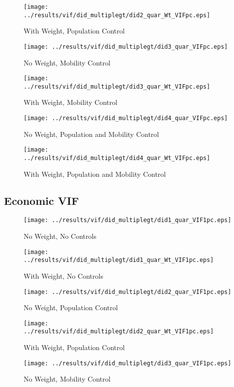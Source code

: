 \documentclass[11pt,letterpaper]{article}
\begin{document}
\begin{figure}[H]
\caption{With Weight, Population Control}
\centering
\texttt{[image: ../results/vif/did\_multiplegt/did2\_quar\_Wt\_VIFpc.eps]}
\end{figure}
\begin{figure}[H]
\caption{No Weight, Mobility Control}
\centering
\texttt{[image: ../results/vif/did\_multiplegt/did3\_quar\_VIFpc.eps]}
\end{figure}

\begin{figure}[H]
\caption{With Weight, Mobility Control}
\centering
\texttt{[image: ../results/vif/did\_multiplegt/did3\_quar\_Wt\_VIFpc.eps]}
\end{figure}
\begin{figure}[H]
\caption{No Weight, Population and Mobility Control}
\centering
\texttt{[image: ../results/vif/did\_multiplegt/did4\_quar\_VIFpc.eps]}
\end{figure}

\begin{figure}[H]
\caption{With Weight, Population and Mobility Control}
\centering
\texttt{[image: ../results/vif/did\_multiplegt/did4\_quar\_Wt\_VIFpc.eps]}
\end{figure}

	\subsection{Economic VIF}
\begin{figure}[H]
\caption{No Weight, No Controls}
\centering
\texttt{[image: ../results/vif/did\_multiplegt/did1\_quar\_VIF1pc.eps]}
\end{figure}

\begin{figure}[H]
\caption{With Weight, No Controls}
\centering
\texttt{[image: ../results/vif/did\_multiplegt/did1\_quar\_Wt\_VIF1pc.eps]}
\end{figure}
\begin{figure}[H]
\caption{No Weight, Population Control}
\centering
\texttt{[image: ../results/vif/did\_multiplegt/did2\_quar\_VIF1pc.eps]}
\end{figure}

\begin{figure}[H]
\caption{With Weight, Population Control}
\centering
\texttt{[image: ../results/vif/did\_multiplegt/did2\_quar\_Wt\_VIF1pc.eps]}
\end{figure}
\begin{figure}[H]
\caption{No Weight, Mobility Control}
\centering
\texttt{[image: ../results/vif/did\_multiplegt/did3\_quar\_VIF1pc.eps]}
\end{figure}
\end{document}
